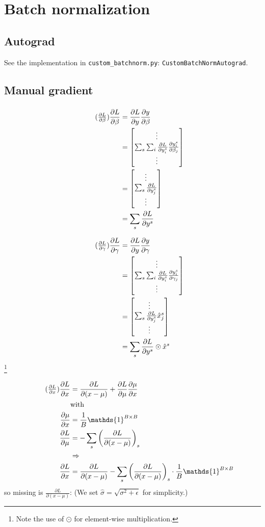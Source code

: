 \documentclass{article}
\newcommand\bM[1]{\ensuremath{\begin{bmatrix}#1\end{bmatrix}}}
\newcommand\·{\ensuremath{\cdot}}
\newcommand\…{\ensuremath{\dots}}
\renewcommand\t{\ensuremath{\times}}
\newcommand{\⇔}{\ensuremath{\Leftrightarrow}}
\newcommand{\⇐}{\ensuremath{\Leftarrow}}
\newcommand{\⇒}{\ensuremath{\Rightarrow}}
\newcommand\f[2]{\ensuremath{\frac{#1}{#2}}}
\newcommand\pf[2]{\ensuremath{\frac{\partial {#1}}{\partial {#2}}}}
\newcommand\1{\ensuremath{\mathds{1}}}
\newcommand\ℝ{\ensuremath{\mathds{R}}}
\begin{document}
\section{Batch normalization}
\subsection{Autograd}
See the implementation in \texttt{custom\_batchnorm.py}: \texttt{CustomBatchNormAutograd}.

\subsection{Manual gradient}
\subsubsection{}
\begin{align*}
  \tag{$\pf{L}{\beta}$}
  \pf{L}{\beta}
  &= \pf{L}{y} \pf{y}{\beta}\\
  &= \bM{\vdots\\ \sum_s\sum_i \pf{L}{y_i^s} \pf{y_i^s}{\beta_j}\\ \vdots}\\
  &= \bM{\vdots\\ \sum_s\pf{L}{y_j^s} \\\vdots}\\
  &= \sum_s\pf{L}{y^s}
\end{align*}

\begin{align*}
  \tag{$\pf{L}{\gamma}$}
  \pf{L}{\gamma}
  &= \pf{L}{y} \pf{y}{\gamma}\\
  &= \bM{\vdots\\ \sum_s\sum_i \pf{L}{y_i^s} \pf{y_i^s}{\gamma_j}\\\vdots}\\
  &= \bM{\vdots\\ \sum_s\pf{L}{y_j^s} \hat{x}_j^s\\\vdots}\\
  &= \sum_s \pf{L}{y^s}\odot\hat{x}^s
\end{align*}
\footnote{Note the use of $\odot$ for element-wise multiplication.}

\begin{align*}
  \tag{\pf{L}{x}}
  \pf{L}{x} &= \pf{L}{(x-\mu)} + \pf{L}{\mu}\pf{\mu}{x}\\
  &\text{with}\\
  \pf{\mu}{x} &= \f{1}{B}\1^{B\t B}\\
  \pf{L}{\mu} &= -\sum_s\left(\pf{L}{(x-\mu)}\right)_s\\
  &\⇒\\
  \pf{L}{x} &= \pf{L}{(x-\mu)} -\sum_s\left(\pf{L}{(x-\mu)}\right)_s\·\f{1}{B}\1^{B\t B}
\end{align*}
so missing is $\pf{L}{(x-\mu)}$: (We set $\hat{\sigma} = \sqrt{\sigma^2 + \epsilon}$ for simplicity.)
\end{document}
